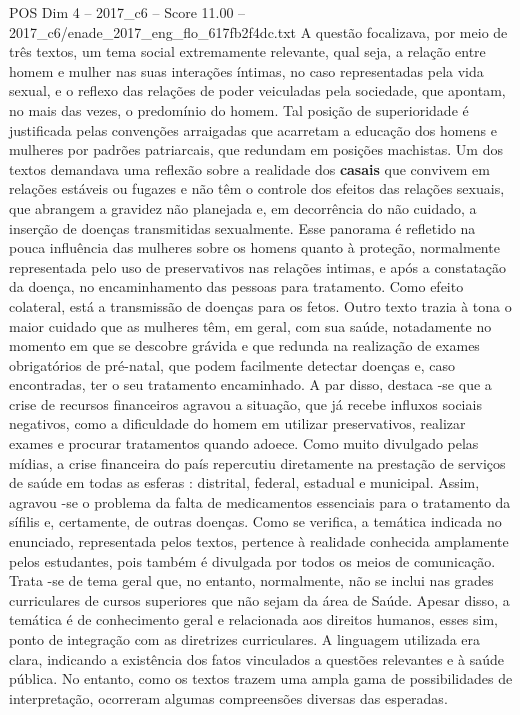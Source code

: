 \begin{textsample}{POS Dim 4 – 2017\_c6 – Score 11.00 – 2017\_c6/enade\_2017\_eng\_flo\_617fb2f4dc.txt}
A questão focalizava, por meio de três textos, um tema social extremamente relevante, qual seja, a relação entre homem e mulher nas suas interações íntimas, no caso representadas pela vida sexual, e o reflexo das relações de poder veiculadas pela sociedade, que apontam, no mais das vezes, o predomínio do homem.
Tal posição de superioridade é justificada pelas convenções arraigadas que acarretam a educação dos homens e mulheres por padrões patriarcais, que redundam em posições machistas.
Um dos textos demandava uma reflexão sobre a realidade dos \textbf{casais} que convivem em relações estáveis ou fugazes e não têm o controle dos efeitos das relações sexuais, que abrangem a gravidez não planejada e, em decorrência do não cuidado, a inserção de doenças transmitidas sexualmente.
Esse panorama é refletido na pouca influência das mulheres sobre os homens quanto à proteção, normalmente representada pelo uso de preservativos nas relações intimas, e após a constatação da doença, no encaminhamento das pessoas para tratamento.
Como efeito colateral, está a transmissão de doenças para os fetos.
Outro texto trazia à tona o maior cuidado que as mulheres têm, em geral, com sua saúde, notadamente no momento em que se descobre grávida e que redunda na realização de exames obrigatórios de pré-natal, que podem facilmente detectar doenças e, caso encontradas, ter o seu tratamento encaminhado.
A par disso, destaca -se que a crise de recursos financeiros agravou a situação, que já recebe influxos sociais negativos, como a dificuldade do homem em utilizar preservativos, realizar exames e procurar tratamentos quando adoece.
Como muito divulgado pelas mídias, a crise financeira do país repercutiu diretamente na prestação de serviços de saúde em todas as esferas : distrital, federal, estadual e municipal.
Assim, agravou -se o problema da falta de medicamentos essenciais para o tratamento da sífilis e, certamente, de outras doenças.
Como se verifica, a temática indicada no enunciado, representada pelos textos, pertence à realidade conhecida amplamente pelos estudantes, pois também é divulgada por todos os meios de comunicação.
Trata -se de tema geral que, no entanto, normalmente, não se inclui nas grades curriculares de cursos superiores que não sejam da área de Saúde.
Apesar disso, a temática é de conhecimento geral e relacionada aos direitos humanos, esses sim, ponto de integração com as diretrizes curriculares.
A linguagem utilizada era clara, indicando a existência dos fatos vinculados a questões relevantes e à saúde pública.
No entanto, como os textos trazem uma ampla gama de possibilidades de interpretação, ocorreram algumas compreensões diversas das esperadas.

\end{textsample}
